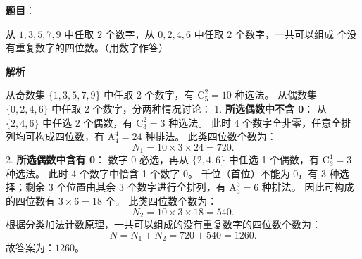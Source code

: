\begin{answer}

\textbf{题目}：

从 $1, 3, 5, 7, 9$ 中任取 $2$ 个数字，从 $0, 2, 4, 6$ 中任取 $2$ 个数字，一共可以组成 \underline{\hspace{2cm}} 个没有重复数字的四位数。（用数字作答）

\textbf{解析}

从奇数集 $\{1, 3, 5, 7, 9\}$ 中任取 2 个数字，有 $\mathrm C_5^2 = 10$ 种选法。
从偶数集 $\{0, 2, 4, 6\}$ 中任取 2 个数字，分两种情况讨论：
1. \textbf{所选偶数中不含 0}：
   从 $\{2, 4, 6\}$ 中任选 2 个偶数，有 $\mathrm C_3^2 = 3$ 种选法。
   此时 4 个数字全非零，任意全排列均可构成四位数，有 $\mathrm A_4^4 = 24$ 种排法。
   此类四位数个数为：
\nopagebreak[4]
\[N_1 = 10 \times 3 \times 24 = 720.\]
2. \textbf{所选偶数中含有 0}：
   数字 0 必选，再从 $\{2, 4, 6\}$ 中任选 1 个偶数，有 $\mathrm C_3^1 = 3$ 种选法。
   此时 4 个数字中恰含 1 个数字 0。
   千位（首位）不能为 0，有 3 种选择；剩余 3 个位置由其余 3 个数字进行全排列，有 $\mathrm A_3^3 = 6$ 种排法。
   因此可构成的四位数有 $3 \times 6 = 18$ 个。
   此类四位数个数为：
\nopagebreak[4]
\[N_2 = 10 \times 3 \times 18 = 540.\]
根据分类加法计数原理，一共可以组成的没有重复数字的四位数个数为：
\nopagebreak[4]
\[N = N_1 + N_2 = 720 + 540 = 1260.\]
故答案为：$1260$。


\end{answer}
